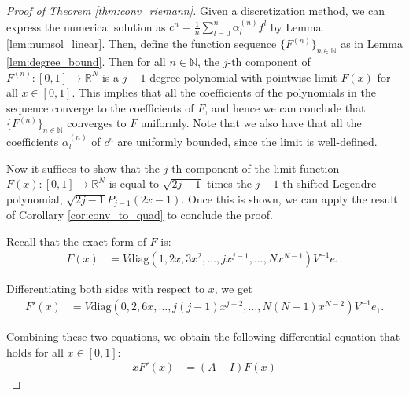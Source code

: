 \documentclass{article}
\theoremstyle{definition}
\newcommand{\pr}[1]{ \left( #1 \right) }
\begin{document}
\begin{proof} [Proof of Theorem \ref{thm:conv_riemann}]
    Given a discretization method, we can express the numerical solution as $c^n = \frac{1}{n} \sum_{l=0}^n \alpha^{(n)}_l f^l$ by Lemma \ref{lem:numsol_linear}.
    Then, define the function sequence $\{F^{(n)}\}_{n \in \mathbb{N}}$ as in Lemma \ref{lem:degree_bound}. Then for all $n \in \mathbb{N}$, the $j$-th component of $F^{(n)}\colon [0,1] \to \mathbb{R}^N$ is a $j-1$ degree polynomial with pointwise limit $F(x)$ for all $x \in [0,1]$. This implies that all the coefficients of the polynomials in the sequence converge to the coefficients of $F$, and hence we can conclude that $\{F^{(n)}\}_{n \in \mathbb{N}}$ converges to $F$ uniformly. 
    Note that we also have that all the coefficients $\alpha^{(n)}_l$ of $c^n$ are uniformly bounded, since the limit is well-defined.

    Now it suffices to show that the $j$-th component of the limit function $F(x)\colon [0,1] \to \mathbb{R}^N$ is equal to $\sqrt{2j-1}$ times the $j-1$-th shifted Legendre polynomial, $\sqrt{2j-1}P_{j-1}(2x-1)$. 
    Once this is shown, we can apply the result of Corollary \ref{cor:conv_to_quad} to conclude the proof.
    
    Recall that the exact form of $F$ is:
    \begin{align*}
        F(x) &= V \text{diag}\pr{1, 2x, 3x^2, \dots, jx^{j-1}, \dots, Nx^{N-1}} V^{-1} e_1.
    \end{align*}

    Differentiating both sides with respect to $x$, we get
    \begin{align*}
        F'(x) &= V \text{diag}\pr{0, 2, 6x, \dots, j(j-1)x^{j-2}, \dots, N(N-1)x^{N-2}} V^{-1} e_1.
    \end{align*}

    Combining these two equations, we obtain the following differential equation that holds for all $x \in [0,1]$:
    \begin{align} \label{eq:F_recur}
        xF'(x) &= (A - I) F(x)
    \end{align}


\end{proof}
\end{document}
